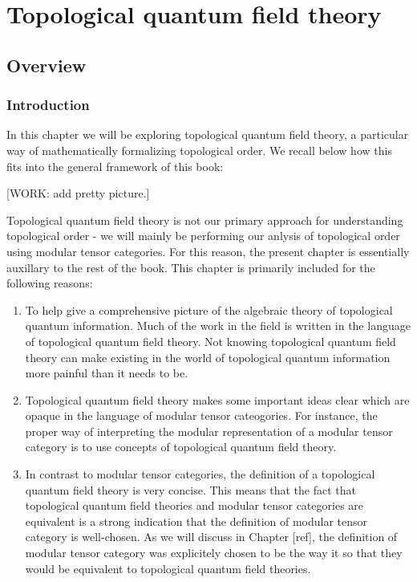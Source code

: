 \documentclass{article}
\theoremstyle{definition}
\numberwithin{figure}{section}
\begin{document}
\section{Topological quantum field theory}

\subsection{Overview}

\subsubsection{Introduction}

In this chapter we will be exploring topological quantum field theory, a particular way of mathematically formalizing topological order. We recall below how this fits into the general framework of this book:

[WORK: add pretty picture.]

Topological quantum field theory is not our primary approach for understanding topological order - we will mainly be performing our anlysis of topological order using modular tensor categories. For this reason, the present chapter is essentially auxillary to the rest of the book. This chapter is primarily included for the following reasons:

\begin{enumerate}
\item To help give a comprehensive picture of the algebraic theory of topological quantum information. Much of the work in the field is written in the language of topological quantum field theory. Not knowing topological quantum field theory can make existing in the world of topological quantum information more painful than it needs to be.

\item Topological quantum field theory makes some important ideas clear which are opaque in the language of modular tensor cateogories. For instance, the proper way of interpreting the modular representation of a modular tensor category is to use concepts of topological quantum field theory.

\item In contrast to modular tensor categories, the definition of a topological quantum field theory is very concise. This means that the fact that topological quantum field theories and modular tensor categories are equivalent is a strong indication that the definition of modular tensor category is well-chosen. As we will discuss in Chapter [ref], the definition of modular tensor category was explicitely chosen to be the way it so that they would be equivalent to topological quantum field theories.
\end{enumerate}
\end{document}
